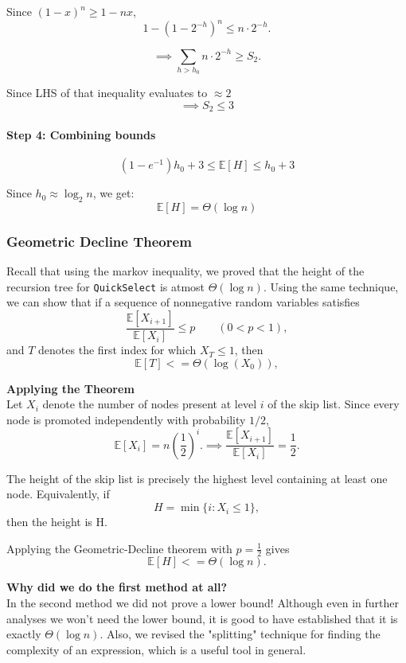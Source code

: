 \documentclass[11pt,openany]{book}
\begin{document}
Since $(1-x)^{n} \ge 1-nx$,
\[
1-(1-2^{-h})^n \le n \cdot 2^{-h}.
\]

\[
\implies
\sum_{h>h_0}n \cdot 2^{-h} \ge S_2.
\]

Since LHS of that inequality evaluates to $\approx 2$
\[
\implies S_2 \le 3
\]

\paragraph{Step 4: Combining bounds}

\[
(1-e^{-1})h_0 + 3\le \mathbb{E}[H] \le h_0 + 3
\]

Since \(h_0 \approx \log_2 n\), we get:
\[
\boxed{\mathbb{E}[H]=\Theta(\log n)}
\]

\subsubsection*{Geometric Decline Theorem}

Recall that using the markov inequality, we proved that the height of the 
recursion tree for \texttt{QuickSelect} is atmost \(\Theta(\log n)\). Using the same technique, 
we can show that if a sequence of nonnegative random variables satisfies
\[
\frac{\mathbb E[X_{i+1}]}{\mathbb E[X_i]}
\le p
\qquad (0<p<1),
\]
and \(T\) denotes the first index for which \(X_T \le 1\), then
\[
\mathbb E[T]<=\Theta(\log (X_0)),
\]

\vspace{1em}

\noindent \textbf{Applying the Theorem}\\

\noindent Let \(X_i\) denote the number of nodes present at level \(i\) of the skip list. Since 
every node is promoted independently with probability \(1/2\),
\[
\mathbb E[X_i]
=
n\left(\frac12\right)^i.
\implies
\frac{\mathbb E[X_{i+1}]}{\mathbb E[X_i]}
=
\frac12.
\]

The height of the skip list is precisely the highest level 
containing at least one node. Equivalently, if
\[
H=\min\{i:X_i \le 1\},
\]
then the height is H.

Applying the Geometric-Decline theorem with \(p=\frac12\) gives
\[
\mathbb E[H]<=\Theta(\log n).
\]

\noindent \textbf{Why did we do the first method at all?}\\

In the second method we did not prove a lower bound! Although even in further 
analyses we won't need the lower bound, it is good to have 
established that it is exactly $\Theta(\log n)$.
Also, we revised the "splitting" technique 
for finding the complexity of an expression, which is a useful tool in general.
\end{document}
